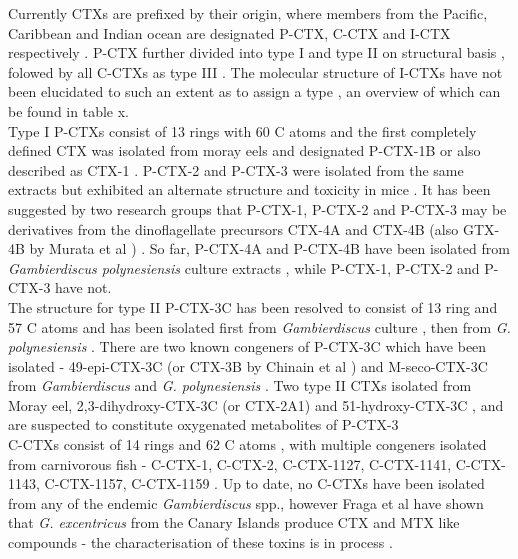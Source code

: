 Currently CTXs are prefixed by their origin, where members from the Pacific, Caribbean and Indian ocean are designated P-CTX, C-CTX and I-CTX respectively \cite{}. %
P-CTX further divided into type I and type II on structural basis \cite{legrand1997two}, folowed by all C-CTXs as type III \cite{}. The molecular structure of I-CTXs have not been elucidated to such an extent as to assign a type \cite{hamilton2002multiple,hamilton2002isolation}, an overview of which can be found in table x.  \\
Type I P-CTXs consist of 13 rings with 60 C atoms \cite{murata1990structures,lewis1991purification,lewis1993origin} and the first completely defined CTX was isolated from moray eels and designated P-CTX-1B \cite{murata1990structures} or also described as CTX-1 \cite{lewis1991purification}. P-CTX-2 and P-CTX-3 were isolated from the same extracts but exhibited an alternate structure and toxicity in mice \cite{lewis1991purification}. It has been suggested by two research groups that P-CTX-1, P-CTX-2 and P-CTX-3 may be derivatives from the dinoflagellate precursors CTX-4A and CTX-4B (also GTX-4B by Murata et al \cite{murata1990structures}) \cite{lewis1993origin,yasumoto2000structural}. So far, P-CTX-4A and P-CTX-4B have been isolated from \emph{Gambierdiscus polynesiensis} culture extracts \cite{chinain2010growth}, while P-CTX-1, P-CTX-2 and P-CTX-3 have not. \\
The structure for type II P-CTX-3C has been resolved to consist of 13 ring and 57 C atoms and has been isolated first from \emph{Gambierdiscus} culture \cite{satake1993structure}, then from \emph{G. polynesiensis} \cite{chinain2010growth}. There are two known congeners of P-CTX-3C which have been isolated - 49-epi-CTX-3C (or CTX-3B by Chinain et al \cite{chinain2010growth}) and M-seco-CTX-3C from \emph{Gambierdiscus} \cite{satake1993structure} and \emph{G. polynesiensis} \cite{chinain2010growth}. Two type II CTXs isolated from Moray eel, 2,3-dihydroxy-CTX-3C (or CTX-2A1) and 51-hydroxy-CTX-3C \cite{satake1998isolation}, and are suspected to constitute oxygenated metabolites of P-CTX-3 \\ %
C-CTXs consist of 14 rings and 62 C atoms \cite{vernoux1997isolation,lewis1998structure,pottier2003identification,pottier2002characterisation}, with multiple congeners isolated from carnivorous fish - C-CTX-1, C-CTX-2, C-CTX-1127, C-CTX-1141, C-CTX-1143, C-CTX-1157, C-CTX-1159 \cite{vernoux1997isolation,lewis1998structure,pottier2003identification,pottier2002characterisation}. Up to date, no C-CTXs have been isolated from any of the endemic \emph{Gambierdiscus} spp., however Fraga et al have shown that \emph{G. excentricus} from the Canary Islands produce CTX and MTX like compounds - the characterisation of these toxins is in process \cite{fraga2011gambierdiscus}. \\
